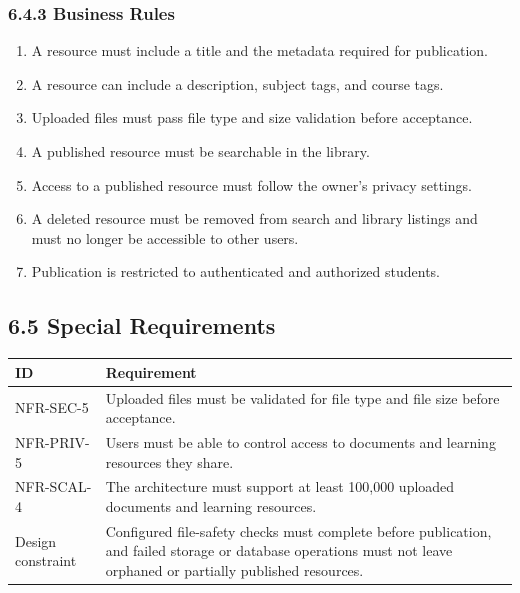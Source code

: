 \documentclass[12pt]{article}
\renewcommand{\baselinestretch}{1.5}
\begin{document}
\subsubsection*{6.4.3 Business Rules}
\par\medskip
\begin{enumerate}
\item A resource must include a title and the metadata required for publication.
\item A resource can include a description, subject tags, and course tags.
\item Uploaded files must pass file type and size validation before acceptance.
\item A published resource must be searchable in the library.
\item Access to a published resource must follow the owner's privacy settings.
\item A deleted resource must be removed from search and library listings and must no longer be accessible to other users.
\item Publication is restricted to authenticated and authorized students.
\end{enumerate}
\par\medskip
\hypertarget{sec:6-5-special-requirements}{}
\subsection*{6.5 Special Requirements}
\par\medskip
\begingroup
\small
\renewcommand{\baselinestretch}{1.0}\selectfont
\renewcommand{\arraystretch}{1.15}
\setlength{\tabcolsep}{6pt}
\begin{longtable}{|>{\raggedright\arraybackslash}p{}|>{\raggedright\arraybackslash}p{}|}
\hline
\textbf{ID} & \textbf{Requirement} \\ \hline
\endhead
NFR-SEC-5 & Uploaded files must be validated for file type and file size before acceptance. \\ \hline
NFR-PRIV-5 & Users must be able to control access to documents and learning resources they share. \\ \hline
NFR-SCAL-4 & The architecture must support at least 100,000 uploaded documents and learning resources. \\ \hline
Design constraint & Configured file-safety checks must complete before publication, and failed storage or database operations must not leave orphaned or partially published resources. \\ \hline
\end{longtable}
\endgroup
\par\medskip
\hypertarget{sec:6-6-preconditions}{}
\end{document}
